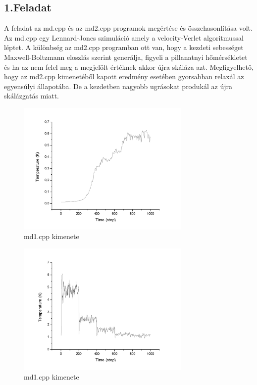 \documentclass[paper=a4, fontsize=11pt]{article}
\begin{document}
\subsection{1.Feladat}
A feladat az md.cpp és az md2.cpp programok megértése és összehasonlítása volt. Az md.cpp egy Lennard-Jones szimuláció amely a velocity-Verlet algoritmussal léptet. A különbség az md2.cpp programban ott van, hogy a kezdeti sebességet Maxwell-Boltzmann eloszlás szerint generálja, figyeli a pillanatnyi hőmérsékletet és ha az nem felel meg a megjelölt értéknek akkor újra skáláza azt. Megfigyelhető, hogy az md2.cpp kimenetéből kapott eredmény esetében gyorsabban relaxál az egyensúlyi állapotába. De a kezdetben nagyobb ugrásokat produkál az újra skálázgatás miatt.
\begin{figure}[H]
    \centering
    \includegraphics[width=0.75\textwidth]{md1}
    \caption{md1.cpp kimenete }
\end{figure}


\begin{figure}[H]
    \centering
    \includegraphics[width=0.75\textwidth]{md2}
    \caption{md1.cpp kimenete }
\end{figure}
\end{document}
